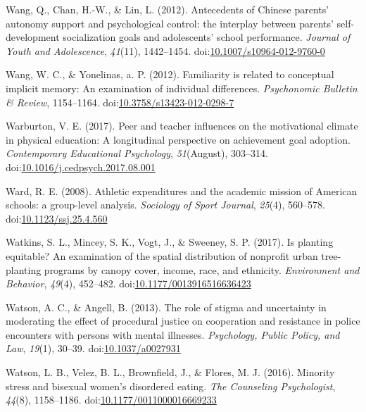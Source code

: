 \documentclass[english,man]{apa6}
\begin{document}
\hypertarget{ref-Wang2012}{}
Wang, Q., Chan, H.-W., \& Lin, L. (2012). Antecedents of Chinese
parents' autonomy support and psychological control: the interplay
between parents' self-development socialization goals and adolescents'
school performance. \emph{Journal of Youth and Adolescence},
\emph{41}(11), 1442--1454.
doi:\href{https://doi.org/10.1007/s10964-012-9760-0}{10.1007/s10964-012-9760-0}

\hypertarget{ref-Wang2012c}{}
Wang, W. C., \& Yonelinas, a. P. (2012). Familiarity is related to
conceptual implicit memory: An examination of individual differences.
\emph{Psychonomic Bulletin \& Review}, 1154--1164.
doi:\href{https://doi.org/10.3758/s13423-012-0298-7}{10.3758/s13423-012-0298-7}

\hypertarget{ref-Warburton2017}{}
Warburton, V. E. (2017). Peer and teacher influences on the motivational
climate in physical education: A longitudinal perspective on achievement
goal adoption. \emph{Contemporary Educational Psychology},
\emph{51}(August), 303--314.
doi:\href{https://doi.org/10.1016/j.cedpsych.2017.08.001}{10.1016/j.cedpsych.2017.08.001}

\hypertarget{ref-Ward2008}{}
Ward, R. E. (2008). Athletic expenditures and the academic mission of
American schools: a group-level analysis. \emph{Sociology of Sport
Journal}, \emph{25}(4), 560--578.
doi:\href{https://doi.org/10.1123/ssj.25.4.560}{10.1123/ssj.25.4.560}

\hypertarget{ref-Watkins2017}{}
Watkins, S. L., Mincey, S. K., Vogt, J., \& Sweeney, S. P. (2017). Is
planting equitable? An examination of the spatial distribution of
nonprofit urban tree-planting programs by canopy cover, income, race,
and ethnicity. \emph{Environment and Behavior}, \emph{49}(4), 452--482.
doi:\href{https://doi.org/10.1177/0013916516636423}{10.1177/0013916516636423}

\hypertarget{ref-Watson2013}{}
Watson, A. C., \& Angell, B. (2013). The role of stigma and uncertainty
in moderating the effect of procedural justice on cooperation and
resistance in police encounters with persons with mental illnesses.
\emph{Psychology, Public Policy, and Law}, \emph{19}(1), 30--39.
doi:\href{https://doi.org/10.1037/a0027931}{10.1037/a0027931}

\hypertarget{ref-Watson2016}{}
Watson, L. B., Velez, B. L., Brownfield, J., \& Flores, M. J. (2016).
Minority stress and bisexual women's disordered eating. \emph{The
Counseling Psychologist}, \emph{44}(8), 1158--1186.
doi:\href{https://doi.org/10.1177/0011000016669233}{10.1177/0011000016669233}
\end{document}
